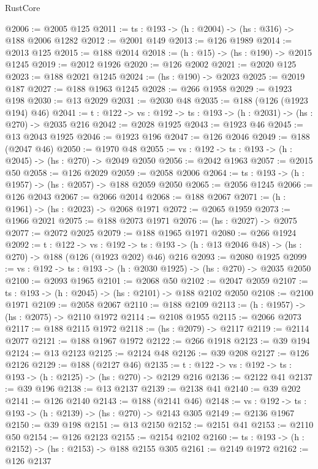 \begin{lexlean}{RustCore}
\begin{coremodule}
@2006 := @2005 @125
@2011 := {ts : @193} -> (h : @2004) -> (hs : @316) -> @188 @2006 @1282
@2012 := @2001 @149
@2013 := @126 @1989
@2014 := @2013 @125
@2015 := @188 @2014
@2018 := (h : @15) -> (hs : @190) -> @2015 @1245
@2019 := @2012 @1926
@2020 := @126 @2002
@2021 := @2020 @125
@2023 := @188 @2021 @1245
@2024 := (hs : @190) -> @2023
@2025 := @2019 @187
@2027 := @188 @1963 @1245
@2028 := @266 @1958
@2029 := @1923 @198
@2030 := @13 @2029
@2031 := @2030 @48
@2035 := @188 (@126 (@1923 @194) @46)
@2041 := {t : @122} -> {vs : @192} -> {ts : @193} -> (h : @2031) -> (hs : @270) -> @2035 @216
@2042 := @2028 @1925
@2043 := @1923 @46
@2045 := @13 @2043 @1925
@2046 := @1923 @196
@2047 := @126 @2046
@2049 := @188 (@2047 @46)
@2050 := @1970 @48
@2055 := {vs : @192} -> {ts : @193} -> (h : @2045) -> (hs : @270) -> @2049 @2050
@2056 := @2042 @1963
@2057 := @2015 @50
@2058 := @126 @2029
@2059 := @2058 @2006
@2064 := {ts : @193} -> (h : @1957) -> (hs : @2057) -> @188 @2059 @2050
@2065 := @2056 @1245
@2066 := @126 @2043
@2067 := @2066 @2014
@2068 := @188 @2067
@2071 := (h : @1961) -> (hs : @2023) -> @2068 @1971
@2072 := @2065 @1959
@2073 := @1966 @2021
@2075 := @188 @2073 @1971
@2076 := (hs : @2027) -> @2075
@2077 := @2072 @2025
@2079 := @188 @1965 @1971
@2080 := @266 @1924
@2092 := {t : @122} ->
  {vs : @192} ->
  {ts : @193} -> (h : @13 @2046 @48) -> (hs : @270) -> @188 (@126 (@1923 @202) @46) @216
@2093 := @2080 @1925
@2099 := {vs : @192} -> {ts : @193} -> (h : @2030 @1925) -> (hs : @270) -> @2035 @2050
@2100 := @2093 @1965
@2101 := @2068 @50
@2102 := @2047 @2059
@2107 := {ts : @193} -> (h : @2045) -> (hs : @2101) -> @188 @2102 @2050
@2108 := @2100 @1971
@2109 := @2058 @2067
@2110 := @188 @2109
@2113 := (h : @1957) -> (hs : @2075) -> @2110 @1972
@2114 := @2108 @1955
@2115 := @2066 @2073
@2117 := @188 @2115 @1972
@2118 := (hs : @2079) -> @2117
@2119 := @2114 @2077
@2121 := @188 @1967 @1972
@2122 := @266 @1918
@2123 := @39 @194
@2124 := @13 @2123
@2125 := @2124 @48
@2126 := @39 @208
@2127 := @126 @2126
@2129 := @188 (@2127 @46)
@2135 := {t : @122} -> {vs : @192} -> {ts : @193} -> (h : @2125) -> (hs : @270) -> @2129 @216
@2136 := @2122 @41
@2137 := @39 @196
@2138 := @13 @2137
@2139 := @2138 @41
@2140 := @39 @202
@2141 := @126 @2140
@2143 := @188 (@2141 @46)
@2148 := {vs : @192} -> {ts : @193} -> (h : @2139) -> (hs : @270) -> @2143 @305
@2149 := @2136 @1967
@2150 := @39 @198
@2151 := @13 @2150
@2152 := @2151 @41
@2153 := @2110 @50
@2154 := @126 @2123
@2155 := @2154 @2102
@2160 := {ts : @193} -> (h : @2152) -> (hs : @2153) -> @188 @2155 @305
@2161 := @2149 @1972
@2162 := @126 @2137

\end{coremodule}
\end{lexlean}
